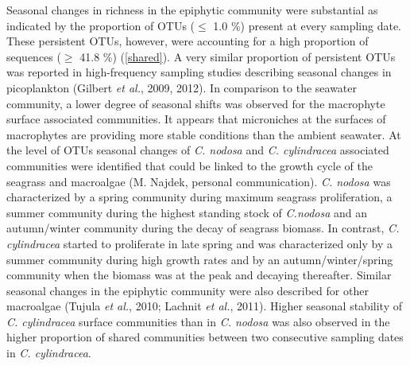 \documentclass[12pt,]{article}
\begin{document}
Seasonal changes in richness in the epiphytic community were substantial
as indicated by the proportion of OTUs (\(\leq\) 1.0 \si{\percent})
present at every sampling date. These persistent OTUs, however, were
accounting for a high proportion of sequences (\(\geq\) 41.8
\si{\percent}) (\autoref{shared}). A very similar proportion of
persistent OTUs was reported in high-frequency sampling studies
describing seasonal changes in picoplankton (Gilbert \emph{et al.},
2009, 2012). In comparison to the seawater community, a lower degree of
seasonal shifts was observed for the macrophyte surface associated
communities. It appears that microniches at the surfaces of macrophytes
are providing more stable conditions than the ambient seawater. At the
level of OTUs seasonal changes of \emph{C. nodosa} and \emph{C.
cylindracea} associated communities were identified that could be linked
to the growth cycle of the seagrass and macroalgae (M. Najdek, personal
communication). \emph{C. nodosa} was characterized by a spring community
during maximum seagrass proliferation, a summer community during the
highest standing stock of \emph{C.nodosa} and an autumn/winter community
during the decay of seagrass biomass. In contrast, \emph{C. cylindracea}
started to proliferate in late spring and was characterized only by a
summer community during high growth rates and by an autumn/winter/spring
community when the biomass was at the peak and decaying thereafter.
Similar seasonal changes in the epiphytic community were also described
for other macroalgae (Tujula \emph{et al.}, 2010; Lachnit \emph{et al.},
2011). Higher seasonal stability of \emph{C. cylindracea} surface
communities than in \emph{C. nodosa} was also observed in the higher
proportion of shared communities between two consecutive sampling dates
in \emph{C. cylindracea}.
\end{document}
